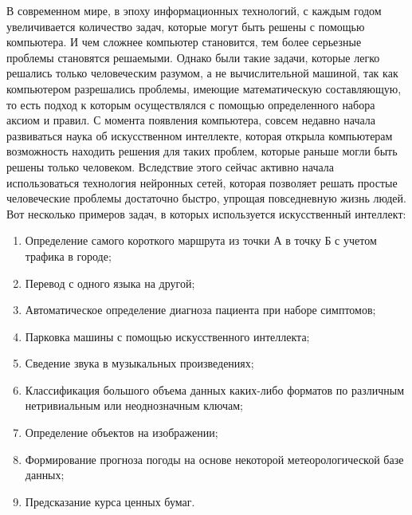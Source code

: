 \documentclass[bachelor, och, coursework]{SCWorks}
\begin{document}


\tableofcontents

\intro

    В современном мире, в эпоху информационных технологий, с каждым годом увеличивается количество задач, которые могут быть решены с помощью компьютера. И чем сложнее компьютер становится, тем более серьезные проблемы становятся решаемыми. Однако были такие задачи, которые легко решались только человеческим разумом, а не вычислительной машиной, так как компьютером разрешались проблемы, имеющие математическую составляющую, то есть подход к которым осуществлялся с помощью определенного набора аксиом и правил. С момента появления компьютера, совсем недавно начала развиваться наука об искусственном интеллекте, которая открыла компьютерам возможность находить решения для таких проблем, которые раньше могли быть решены только человеком. Вследствие этого сейчас активно начала использоваться технология нейронных сетей, которая позволяет решать простые человеческие проблемы достаточно быстро, упрощая повседневную жизнь людей. 
    Вот несколько примеров задач, в которых используется искусственный интеллект:
    
    \begin{enumerate}
        \item Определение самого короткого маршрута из точки А в точку Б с учетом трафика в городе;
        \item Перевод с одного языка на другой;
        \item Автоматическое определение диагноза пациента при наборе симптомов;
        \item Парковка машины с помощью искусственного интеллекта;
        \item Сведение звука в музыкальных произведениях;
        \item Классификация большого объема данных каких-либо форматов по различным нетривиальным или неоднозначным ключам;
        \item Определение объектов на изображении;
        \item Формирование прогноза погоды на основе некоторой метеорологической базе данных;
        \item Предсказание курса ценных бумаг.
    \end{enumerate}
\end{document}
